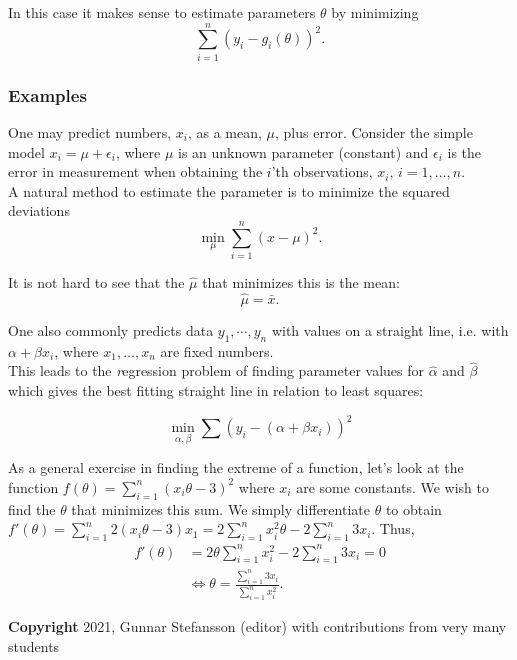 \documentclass[12pt,a4paper]{article}
\theoremstyle{regla}
\theoremstyle{remark}
\theoremstyle{definition}
\theoremstyle{nonumberbreak}
\begin{document}
In this case it makes sense to estimate parameters $\theta$ by minimizing 
$$
\sum_{i=1}^{n}{(y_i - g_i (\theta))^2} .
$$

\subsubsection{Examples}
\begin{xmpl}
One may predict numbers, $x_i$, as a mean, $\mu$, plus error.  Consider the simple
model $x_i = \mu + \epsilon_i$, where 
$\mu$ is an unknown parameter (constant) and $\epsilon_i$ is the error in measurement
when obtaining the $i$'th observations, $x_i$, $i=1,\ldots , n$.\\

A natural method to estimate the parameter 
is to minimize the squared deviations
$$
\min_{\mu} \sum_{i=1}^n \left (x - \mu \right )^2  .
$$

It is not hard to see that the $\hat{\mu}$ that minimizes this is the mean:
$$
\hat{ \mu} = \bar{x} .
$$
\end{xmpl}
\begin{xmpl}
One also commonly  predicts data $y_1 , \cdots ,y_n$ with values on a straight line, i.e. with $\alpha + \beta x_i$, where $x_1, \ldots , x_n$ are fixed numbers. \\

This leads to the {\emph regression problem} of finding parameter values for $\hat{\alpha}$ and $\hat{\beta}$ which gives the best fitting straight line in relation to least squares:

$$
\min_{\alpha,\beta} \sum \left ( y_i - ( \alpha + \beta x_i) \right ) ^2
$$ 
\end{xmpl}

\begin{xmpl}
As a general exercise in finding the extreme of a function, let's look at the function $f(\theta)=\sum_{i=1}^n(x_i\theta -3)^2$ where $x_i$ are some constants. We wish to find the $\theta$ that minimizes this sum. We simply differentiate $\theta$ to obtain $f'(\theta)=\sum_{i=1}^n2(x_i\theta -3)x_1=2\sum_{i=1}^n x^2_i\theta -2\sum_{i=1}^n3x_i$. Thus,
\begin{align*}
f'(\theta)&=2\theta \sum_{i=1}^n x^2_i-2\sum_{i=1}^n3x_i=0\\
&\Leftrightarrow \theta=\frac{\sum_{i=1}^n3x_i}{\sum_{i=1}^n x^2_i}.
\end{align*}
\end{xmpl}

{\bf Copyright}
2021, Gunnar Stefansson (editor) with contributions from very many students
\end{document}
